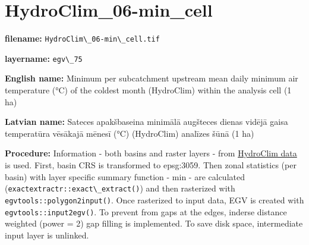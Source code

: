 \documentclass[
]{book}
\newcommand{\passthrough}[1]{#1}
\begin{document}
\section{HydroClim\_06-min\_cell}\label{ch06.075}

\textbf{filename:} \passthrough{\lstinline!HydroClim\_06-min\_cell.tif!}

\textbf{layername:} \passthrough{\lstinline!egv\_75!}

\textbf{English name:} Minimum per subcatchment upstream mean daily minimum air temperature (°C) of the coldest month (HydroClim) within the analysis cell (1 ha)

\textbf{Latvian name:} Sateces apakšbaseina minimālā augšteces dienas vidējā gaisa temperatūra vēsākajā mēnesī (°C) (HydroClim) analīzes šūnā (1 ha)

\textbf{Procedure:} Information - both basins and raster layers - from \hyperref[Ch04.12]{HydroClim data}
is used. First, basin CRS is transformed to epsg:3059. Then zonal statistics (per basin) with
layer specific summary function - min - are calculated (\passthrough{\lstinline!exactextractr::exact\_extract()!})
and then rasterized with \passthrough{\lstinline!egvtools::polygon2input()!}. Once rasterized to input data,
EGV is created with \passthrough{\lstinline!egvtools::input2egv()!}. To prevent from gaps at the edges,
inderse distance weighted (power = 2) gap filling is implemented. To save disk space,
intermediate input layer is unlinked.
\end{document}
